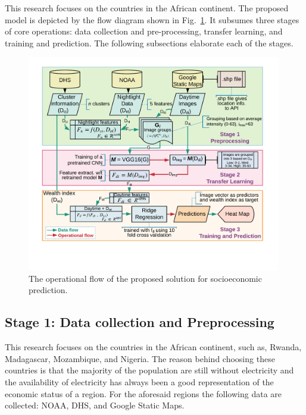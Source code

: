 This research focuses on the countries in the African continent.
The proposed model is depicted by the flow diagram shown in Fig.~\ref{fig:proposed_model}. It subsumes three stages of core operations: data collection and pre-processing, transfer learning, and training and prediction. The following subsections elaborate each of the stages.



\begin{figure}[h!]
\centering
  \includegraphics[width=0.99\textwidth]{setup/img/projectfinalflowchart.png}
  \caption{The operational flow of the proposed solution for socioeconomic prediction.}
  \label{fig:proposed_model}
  \centering
\end{figure}

  


\subsection{Stage 1: Data collection and Preprocessing}
This research focuses on the countries in the African continent, such as, Rwanda, Madagascar, Mozambique, and Nigeria. 
The reason behind choosing these countries is that the majority of the population are still without electricity and the availability of electricity has always been a good representation of the economic status of a region. For the aforesaid regions the following data are collected: NOAA, DHS, and Google Static Maps.

